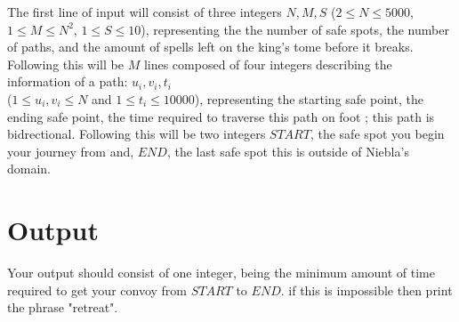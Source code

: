 \noindent The first line of input will consist of three integers $N, M, S$
($2 \leq N \leq 5000$, $ 1 \leq M \leq N^2$, $1 \leq S \leq 10$), representing the the number of safe spots, the
number of paths, and the amount of spells left on the king's tome before it breaks. \\

\noindent Following this will be $M$ lines composed of four integers describing the information of a path:
$u_i, v_i, t_i$ \\ ($1 \leq u_i,v_i \leq N$ and $1 \leq t_i \leq 10000$), representing the starting safe point,
the ending safe point, the time required to traverse this path on foot ; this path is bidrectional. Following this
will be two integers $START$, the safe spot you begin your journey from and, $END$, the last safe spot this is outside of
Niebla's domain. \\

\section*{Output}

Your output should consist of one integer, being the minimum amount of time required to get your convoy from $START$ to
$END$. if this is impossible then print the phrase "retreat".
